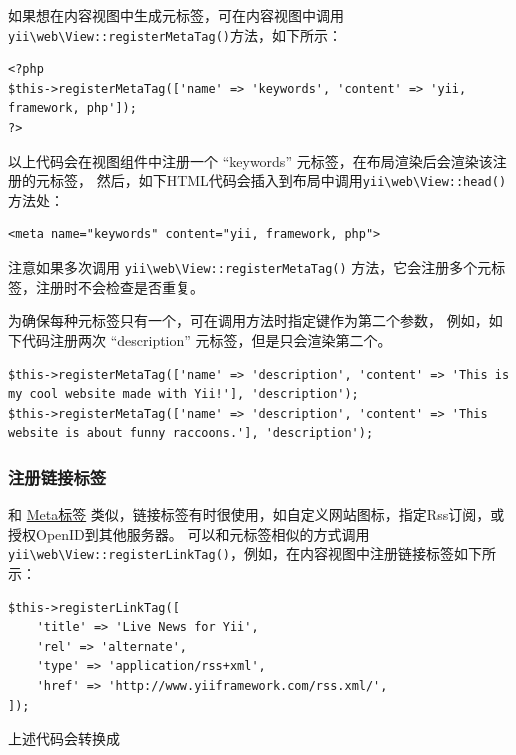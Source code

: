 如果想在内容视图中生成元标签，可在内容视图中调用\texttt{yii{\allowbreak{}\textbackslash}web{\allowbreak{}\textbackslash}View\allowbreak{}::\allowbreak{}registerMetaTag()}方法，如下所示：

\lstset{language=php}\begin{lstlisting}
<?php
$this->registerMetaTag(['name' => 'keywords', 'content' => 'yii, framework, php']);
?>
\end{lstlisting}
以上代码会在视图组件中注册一个 ``keywords'' 元标签，在布局渲染后会渲染该注册的元标签，
然后，如下HTML代码会插入到布局中调用\texttt{yii{\allowbreak{}\textbackslash}web{\allowbreak{}\textbackslash}View\allowbreak{}::\allowbreak{}head()}方法处：

\lstset{language=php}\begin{lstlisting}
<meta name="keywords" content="yii, framework, php">
\end{lstlisting}
注意如果多次调用 \texttt{yii{\allowbreak{}\textbackslash}web{\allowbreak{}\textbackslash}View\allowbreak{}::\allowbreak{}registerMetaTag()} 方法，它会注册多个元标签，注册时不会检查是否重复。

为确保每种元标签只有一个，可在调用方法时指定键作为第二个参数，
例如，如下代码注册两次 ``description'' 元标签，但是只会渲染第二个。

\lstset{language=html}\begin{lstlisting}
$this->registerMetaTag(['name' => 'description', 'content' => 'This is my cool website made with Yii!'], 'description');
$this->registerMetaTag(['name' => 'description', 'content' => 'This website is about funny raccoons.'], 'description');
\end{lstlisting}
\subsubsection{注册链接标签 \label{structure-views.md::registering-link-tags}}
和 \hyperref[structure-views.md::::adding-meta-tags]{Meta标签} 类似，链接标签有时很使用，如自定义网站图标，指定Rss订阅，或授权OpenID到其他服务器。
可以和元标签相似的方式调用\texttt{yii{\allowbreak{}\textbackslash}web{\allowbreak{}\textbackslash}View\allowbreak{}::\allowbreak{}registerLinkTag()}，例如，在内容视图中注册链接标签如下所示：

\lstset{language=php}\begin{lstlisting}
$this->registerLinkTag([
    'title' => 'Live News for Yii',
    'rel' => 'alternate',
    'type' => 'application/rss+xml',
    'href' => 'http://www.yiiframework.com/rss.xml/',
]);
\end{lstlisting}
上述代码会转换成


